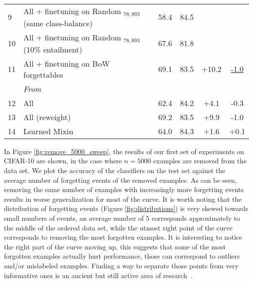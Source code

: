 \begin{table*}[ht]
\begin{tabular}{llcccc}
\small{9} & \hspace{0.1cm} All + finetuning on Random $_{78,893}$ (same class-balance)      & 58.4 & 84.5 &  &  \\
\small{10} & \hspace{0.1cm} All + finetuning on Random $_{78,893}$ (10\% entailment)     & 67.6 & 81.8 &  &  \\
\small{11} & All + finetuning on BoW forgettables    & 69.1 & 83.5 & +10.2 & \underline{-1.0} \\
\midrule
&\emph{From~\cite{clark2019dont}} & & & & \\
\small{12} & All & 62.4 & 84.2 & +4.1 & -0.3 \\
\small{13} & All (reweight) & 69.2 & 83.5 & +9.9 & -1.0 \\
\small{14} & Learned Mixin & 64.0 & 84.3 & +1.6 & +0.1 \\
\bottomrule
\end{tabular}
\end{table*}



In Figure \ref{fig:remove_5000_sweep}, the results of our first set of experiments on CIFAR-10 are shown, in the case where $n = 5000$ examples are removed from the data set. We plot the accuracy of the classifiers on the test set against the average number of forgetting events of the removed examples. As can be seen, removing the same number of examples with increasingly more forgetting events results in worse generalization for most of the curve. It is worth noting that the distribution of forgetting events (Figure \ref{fig:distributions}) is very skewed towards small numbers of events, an average number of $5$ corresponds approximately to the middle of the ordered data set, while the utmost right point of the curve corresponds to removing the most forgotten examples. It is interesting to notice the right part of the curve moving up, this suggests that some of the most forgotten examples actually hurt performance, those can correspond to outliers and/or mislabeled examples. Finding a way to separate those points from very informative ones is an ancient but still active area of research~\citep{john1995robust,jiang18mentor}.


